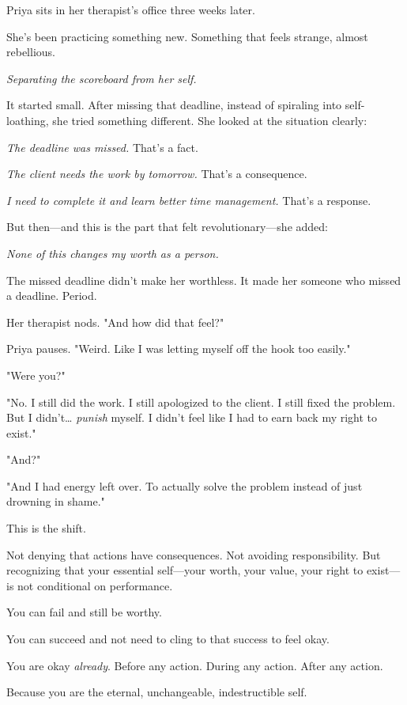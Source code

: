 \documentclass[11pt,twoside]{book}
\begin{document}
Priya sits in her therapist's office three weeks later.

She's been practicing something new. Something that feels strange, almost rebellious.

\emph{Separating the scoreboard from her self.}

It started small. After missing that deadline, instead of spiraling into self-loathing, she tried something different. She looked at the situation clearly:

\emph{The deadline was missed.} That's a fact.

\emph{The client needs the work by tomorrow.} That's a consequence.

\emph{I need to complete it and learn better time management.} That's a response.

But then—and this is the part that felt revolutionary—she added:

\emph{None of this changes my worth as a person.}

The missed deadline didn't make her worthless. It made her someone who missed a deadline. Period.

Her therapist nods. "And how did that feel?"

Priya pauses. "Weird. Like I was letting myself off the hook too easily."

"Were you?"

"No. I still did the work. I still apologized to the client. I still fixed the problem. But I didn't\ldots{} \emph{punish} myself. I didn't feel like I had to earn back my right to exist."

"And?"

"And I had energy left over. To actually solve the problem instead of just drowning in shame."

This is the shift.

Not denying that actions have consequences. Not avoiding responsibility. But recognizing that your essential self—your worth, your value, your right to exist—is not conditional on performance.

You can fail and still be worthy.

You can succeed and not need to cling to that success to feel okay.

You are okay \emph{already}. Before any action. During any action. After any action.

Because you are the eternal, unchangeable, indestructible self.
\end{document}
